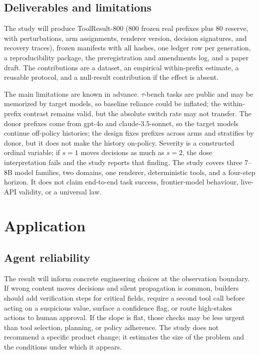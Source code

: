 \documentclass[11pt,a4paper]{article}
\begin{document}
\subsection{Deliverables and limitations}
The study will produce ToolResult-800 (800 frozen real prefixes plus 80 reserve, with perturbations,
arm assignments, renderer version, decision signatures, and recovery traces), frozen manifests
with all hashes, one ledger row per generation, a reproducibility package, the preregistration and
amendments log, and a paper draft. The contributions are a dataset, an empirical within-prefix
estimate, a reusable protocol, and a null-result contribution if the effect is absent.

The main limitations are known in advance. $\tau$-bench tasks are public and may be memorized by
target models, so baseline reliance could be inflated; the within-prefix contrast remains valid,
but the absolute switch rate may not transfer. The donor prefixes come from gpt-4o and
claude-3.5-sonnet, so the target models continue off-policy histories; the design fixes prefixes
across arms and stratifies by donor, but it does not make the history on-policy. Severity is a
constructed ordinal variable; if $s=1$ moves decisions as much as $s=2$, the dose interpretation
fails and the study reports that finding. The study covers three 7--8B model families, two domains,
one renderer, deterministic tools, and a four-step horizon. It does not claim end-to-end task
success, frontier-model behaviour, live-API validity, or a universal law.

\section{Application}

\subsection{Agent reliability}
The result will inform concrete engineering choices at the observation boundary. If wrong content
moves decisions and silent propagation is common, builders should add verification steps for
critical fields, require a second tool call before acting on a suspicious value, surface a
confidence flag, or route high-stakes actions to human approval. If the slope is flat, those checks
may be less urgent than tool selection, planning, or policy adherence. The study does not recommend
a specific product change; it estimates the size of the problem and the conditions under which it
appears.
\end{document}
